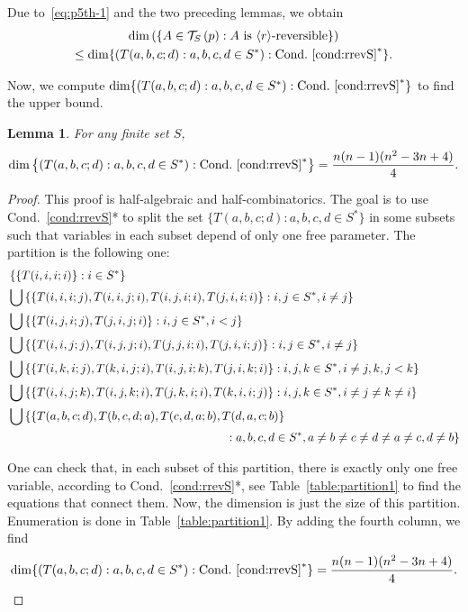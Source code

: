 \documentclass[10pt]{amsart}
\newtheorem{lemm}[theo]{Lemma}\newtheorem{prop}[theo]{Proposition}\newtheorem{coro}[theo]{Corollary}\newtheorem{conj}[theo]{Conjecture}
\theoremstyle{definition}\newtheorem{defi}[theo]{Definition}\newtheorem{rema}[theo]{Remark}\newtheorem{exam}[theo]{Example}\newtheorem{exem}[theo]{Example}\newtheorem{nota}[theo]{Notation}
\DeclarePairedDelimiter{\vect}{\langle}{\rangle}
\newcounter{a}
\newcommand{\Cond}{Cond.}
\newcommand{\triang}[2]{\mathcal{T}_{#1} \left(#2 \right)}
\begin{document}
Due to~\eqref{eq:p5th-1} and the two preceding lemmas, we obtain
\begin{multline*}
\dim \left(\{A \in \triang{S}{p} :A \text{ is $\vect{r}$-reversible}\} \right) \\
\leq \dim \{(T(a,b,c;d) : a,b,c,d \in S^*) : \text{\Cond}~\ref{cond:rrevS}^*\}.
\end{multline*}

Now, we compute $\dim \{(T(a,b,c;d) : a,b,c,d \in S^*) : \text{\Cond}~\ref{cond:rrevS}^*\}$ to find the upper bound.

\begin{lemm}\label{lem:dim-5*}
For any finite set $S$,
\begin{equation*}
\dim \left\{(T(a,b,c;d) : a,b,c,d \in S^*) : \text{\Cond}~\ref{cond:rrevS}^*\right\} = \frac{n (n-1) (n^2-3n+4)}{4}.
\end{equation*}
\end{lemm}

\begin{proof}
This proof is half-algebraic and half-combinatorics. The goal is to use \Cond~\ref{cond:rrevS}* to split the set $\{T(a,b,c;d) : a,b,c,d \in S^*\}$ in some subsets such that variables in each subset depend of only one free parameter. The partition is the following one: {\small
\begin{align*}
& \left \{ \left\{ T(i,i,i;i) \right\}: i \in S^* \right\} \\
&\bigcup \left \{ \left\{ T(i,i,i;j), T(i,i,j;i), T(i,j,i;i), T(j,i,i;i) \right\}: i,j \in S^*, i \neq j \right\} \\
&\bigcup \left \{ \left\{ T(i,j,i;j), T(j,i,j;i) \right\}: i,j \in S^*, i<j \right\} \\
&\bigcup \left \{ \left\{ T(i,i,j;j), T(i,j,j;i), T(j,j,i;i), T(j,i,i;j) \right\}: i,j \in S^*, i \neq j \right\} \\
&\bigcup \left \{ \left\{ T(i,k,i;j), T(k,i,j;i), T(i,j,i;k), T(j,i,k;i) \right\}: i,j,k\in S^*,i\neq j,k,j<k \right\}\\
&\bigcup \left \{ \left\{ T(i,i,j;k), T(i,j,k;i), T(j,k,i;i), T(k,i,i;j) \right\}: i,j,k \in S^*, i \neq j \neq k \neq i \right\} \\
&\bigcup \left \{ \{ T(a,b,c;d), T(b,c,d;a), T(c,d,a;b), T(d,a,c;b) \right\}\\
&\mkern 330mu: a,b,c,d \in S^*, a \neq b \neq c \neq d \neq a \neq c, d \neq b \}
\end{align*}
}

One can check that, in each subset of this partition, there is exactly only one free variable, according to \Cond~\ref{cond:rrevS}*, see Table~\ref{table:partition1} to find the equations that connect them. Now, the dimension is just the size of this partition. Enumeration is done in Table~\ref{table:partition1}. By adding the fourth column, we find
\[
\dim \{(T(a,b,c;d) : a,b,c,d \in S^*) : \text{\Cond}~\ref{cond:rrevS}^*\} =  \frac{n (n-1) (n^2-3n+4)}{4}. \qedhere
\]
\end{proof}
\end{document}
